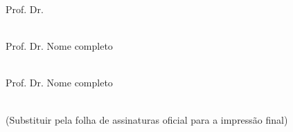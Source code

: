 \begin{folhaassinaturas}
{    \beginskip
    \signature{Orientador:}{Prof. Dr. \theadvisor} \\
    \InstituicaoMembro{}{\theuniversity} \\

    \sigskip
    \beginskip
    \signature{Membro externo da Banca:}{Prof. Dr. Nome completo} \\
     \\

    \sigskip
    \beginskip
    \signature{Membro externo da Banca:}{Prof. Dr. Nome completo} \\
     \\


\begin{center}
 (Substituir pela folha de assinaturas oficial para a impressão final)   
\end{center}


    \vfill
    \setcounter{page}{3}
}


\signaturepage


\end{folhaassinaturas}

